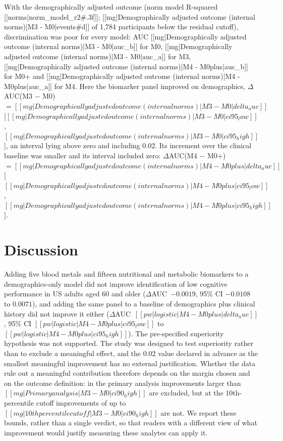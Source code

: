 \documentclass[12pt]{article}
\newcommand{\deltaauc}{$\Delta$AUC}
\begin{document}
With the demographically adjusted outcome (norm model R-squared [[norms|norm_model_r2#.3f]]; [[mg|Demographically adjusted outcome (internal norms)|M3 - M0|events#d]] of 1,784 participants below the residual cutoff), discrimination was poor for every model: AUC [[mg|Demographically adjusted outcome (internal norms)|M3 - M0|auc_b]] for M0, [[mg|Demographically adjusted outcome (internal norms)|M3 - M0|auc_a]] for M3, [[mg|Demographically adjusted outcome (internal norms)|M4 - M0plus|auc_b]] for M0+ and [[mg|Demographically adjusted outcome (internal norms)|M4 - M0plus|auc_a]] for M4. Here the biomarker panel improved on demographics, \deltaauc(M3 $-$ M0) $= [[mg|Demographically adjusted outcome (internal norms)|M3 - M0|delta_auc]]$ [$[[mg|Demographically adjusted outcome (internal norms)|M3 - M0|ci95_low]]$, $[[mg|Demographically adjusted outcome (internal norms)|M3 - M0|ci95_high]]$], an interval lying above zero and including 0.02. Its increment over the clinical baseline was smaller and its interval included zero: \deltaauc(M4 $-$ M0+) $= [[mg|Demographically adjusted outcome (internal norms)|M4 - M0plus|delta_auc]]$ [$[[mg|Demographically adjusted outcome (internal norms)|M4 - M0plus|ci95_low]]$, $[[mg|Demographically adjusted outcome (internal norms)|M4 - M0plus|ci95_high]]$].

\section*{Discussion}

Adding five blood metals and fifteen nutritional and metabolic biomarkers to a demographics-only model did not improve identification of low cognitive performance in US adults aged 60 and older (\deltaauc\ $-0.0019$, 95\% CI $-0.0108$ to $0.0071$), and adding the same panel to a baseline of demographics plus clinical history did not improve it either (\deltaauc\ $[[pw|logistic|M4 - M0plus|delta_auc]]$, 95\% CI $[[pw|logistic|M4 - M0plus|ci95_low]]$ to $[[pw|logistic|M4 - M0plus|ci95_high]]$). The pre-specified superiority hypothesis was not supported. The study was designed to test superiority rather than to exclude a meaningful effect, and the 0.02 value declared in advance as the smallest meaningful improvement has no external justification. Whether the data rule out a meaningful contribution therefore depends on the margin chosen and on the outcome definition: in the primary analysis improvements larger than $[[mg|Primary analysis|M3 - M0|ci90_high]]$ are excluded, but at the 10th-percentile cutoff improvements of up to $[[mg|10th percentile cutoff|M3 - M0|ci90_high]]$ are not. We report these bounds, rather than a single verdict, so that readers with a different view of what improvement would justify measuring these analytes can apply it.
\end{document}
